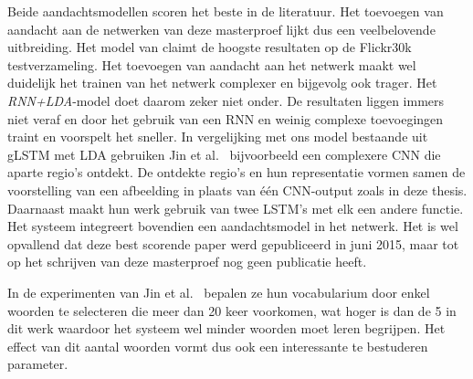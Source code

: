 Beide aandachtsmodellen scoren het beste in de literatuur. Het toevoegen van aandacht aan de netwerken van deze masterproef lijkt dus een veelbelovende uitbreiding.
Het model van \cite{Jin2015} claimt de hoogste resultaten op de Flickr30k testverzameling.
Het toevoegen van aandacht aan het netwerk maakt wel duidelijk het trainen van het netwerk complexer en bijgevolg ook trager.
Het \emph{RNN+LDA}-model doet daarom zeker niet onder. De resultaten liggen immers niet veraf en door het gebruik van een RNN en weinig complexe toevoegingen traint en voorspelt het sneller.
In vergelijking met ons model bestaande uit gLSTM met LDA gebruiken Jin et al.~\cite{Jin2015} bijvoorbeeld een complexere CNN die aparte regio's ontdekt. De ontdekte regio's en hun representatie vormen samen de voorstelling van een afbeelding in plaats van \'e\'en CNN-output zoals in deze thesis. Daarnaast maakt hun werk gebruik van twee LSTM's met elk een andere functie. Het systeem integreert bovendien een aandachtsmodel in het netwerk.
Het is wel opvallend dat deze best scorende paper werd gepubliceerd in juni 2015, maar tot op het schrijven van deze masterproef nog geen publicatie heeft.

In de experimenten van Jin et al.~\cite{Jin2015} bepalen ze hun vocabularium door enkel woorden te selecteren die meer dan 20 keer voorkomen, wat hoger is dan de 5 in dit werk waardoor het systeem wel minder woorden moet leren begrijpen. Het effect van dit aantal woorden vormt dus ook een interessante te bestuderen parameter.


